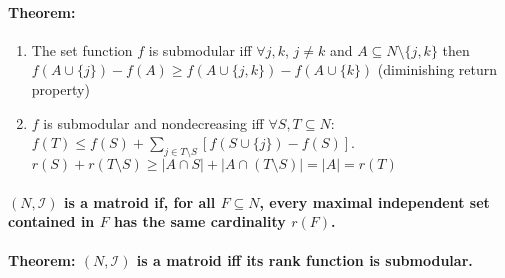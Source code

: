 \documentclass[main]{subfiles}
\begin{document}
\paragraph{Theorem:}
\begin{enumerate}
\itemsep0em
\item The set function $f$ is submodular iff $\forall j, k$, $j \neq k$ and
$A \subseteq N \setminus \{j,k\}$ then $f(A \cup \{j\}) - f(A) \geq f(A \cup
\{j,k\}) - f(A \cup \{k\})$ (diminishing return property)
\item $f$ is submodular and nondecreasing iff $\forall S, T \subseteq N$:
$f(T) \leq f(S) + \sum_{j \in T\setminus S} [f(S \cup \{j\}) - f(S)]$.
\subitem $r(S) + r(T\setminus S) \geq |A \cap S| + |A \cap (T\setminus S)| =
|A| = r(T)$
\end{enumerate}

\paragraph{$(N,\mathcal{I})$ is a matroid if, for all $F \subseteq N$, every
maximal independent set contained in $F$ has the same cardinality $r(F)$.}

\paragraph{Theorem: $(N,\mathcal{I})$ is a matroid iff its rank function is
submodular.}
\end{document}
